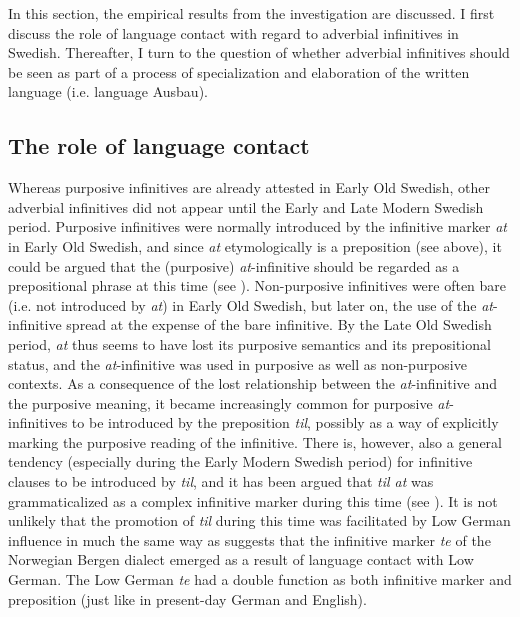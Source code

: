 \documentclass[output=paper]{langscibook}
\begin{document}
In this section, the empirical results from the investigation are discussed. I first discuss the role of language contact with regard to adverbial infinitives in Swedish. Thereafter, I turn to the question of whether adverbial infinitives should be seen as part of a process of specialization and elaboration of the written language (i.e. language Ausbau). 


\subsection{The role of language contact}\label{sec:kalm:5.1}

Whereas purposive infinitives are already attested in Early Old Swedish, other adverbial infinitives did not appear until the Early and Late Modern Swedish period. Purposive infinitives were normally introduced by the infinitive marker \textit{at} in Early Old Swedish, and since \textit{at} etymologically is a preposition (see  above), it could be argued that the (purposive) \textit{at}{}-infinitive should be regarded as a prepositional phrase at this time (see \citealt{Kalm2016Satsekvivalenta}). Non-purposive infinitives were often bare (i.e. not introduced by \textit{at}) in Early Old Swedish, but later on, the use of the \textit{at}{}-infinitive spread at the expense of the bare infinitive. By the Late Old Swedish period, \textit{at} thus seems to have lost its purposive semantics and its prepositional status, and the \textit{at}{}-infinitive was used in purposive as well as non-purposive contexts. As a consequence of the lost relationship between the \textit{at}{}-infinitive and the purposive meaning, it became increasingly common for purposive \textit{at}{}-infinitives to be introduced by the preposition \textit{til}, possibly as a way of explicitly marking the purposive reading of the infinitive. There is, however, also a general tendency (especially during the Early Modern Swedish period) for infinitive clauses to be introduced by \textit{til}, and it has been argued that \textit{til at} was grammaticalized as a complex infinitive marker during this time (see \citealt{Kalm2014,Kalm2016Satsekvivalenta}). It is not unlikely that the promotion of \textit{til} during this time was facilitated by Low German influence in much the same way as \citet{Nesse2002} suggests that the infinitive marker \textit{te} of the Norwegian Bergen dialect emerged as a result of language contact with Low German. The Low German \textit{te} had a double function as both infinitive marker and preposition (just like in present-day German and English).
\end{document}
